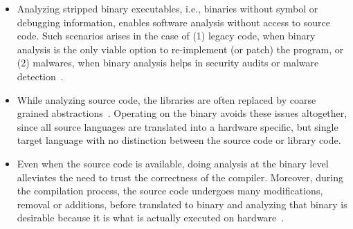 \begin{itemize}
    
    \item Analyzing stripped binary executables, i.e., binaries without symbol
    or debugging information, enables software analysis without access to
    source code. Such scenarios arises in the case of (1) legacy code, when
    binary analysis is the only viable option to re-implement (or patch) the
    program, or (2) malwares, when binary analysis helps in security audits or
    malware
    detection~\cite{Christodorescu:2005,Andreas2007,Kinder:2005,Kinder:2010,Kolbitsch:2009}.
    
    \item 
    While analyzing source code, the libraries are often replaced by
    coarse grained abstractions~\cite{libabs}. Operating on the binary avoids
    these issues altogether, since all source languages are translated into a
    hardware specific, but single target language with no distinction between
    the source code or library code. 
    
    \item Even when the source code is available, doing analysis at the binary
    level alleviates the need to trust the correctness of the compiler.
    Moreover, during the compilation process, the source code undergoes many
    modifications, removal or additions, before translated to binary and
    analyzing that binary is desirable because it is what is actually executed on
    hardware~\cite{WYSINWYE}. 
    
\end{itemize}

